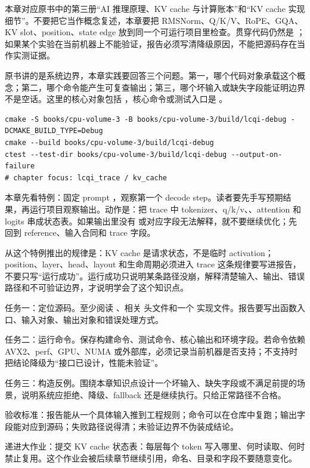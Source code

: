
本章对应原书中的第三册“AI 推理原理、KV cache 与计算账本”和“KV cache 实现细节”。不要把它当作概念复述，本章要把 RMSNorm、Q/K/V、RoPE、GQA、KV slot、position、state edge 放到同一个可运行项目里检查。贯穿代码仍然是 ；如果某个实验在当前机器上不能验证，报告必须写清降级原因，不能把源码存在当作实测证据。


原书讲的是系统边界，本章实践要回答三个问题。第一，哪个代码对象承载这个概念；第二，哪个命令能产生可复查输出；第三，哪个坏输入或缺失字段能证明边界不是空话。这里的核心对象包括 ，核心命令或测试入口是 。

\begin{lstlisting}[numbers=none,caption={第 5 章实践：Transformer 切片与 KV Cache 状态 的最小命令入口}]
cmake -S books/cpu-volume-3 -B books/cpu-volume-3/build/lcqi-debug -DCMAKE_BUILD_TYPE=Debug
cmake --build books/cpu-volume-3/build/lcqi-debug
ctest --test-dir books/cpu-volume-3/build/lcqi-debug --output-on-failure
# chapter focus: lcqi_trace / kv_cache
\end{lstlisting}


本章先看特例：固定 prompt ，观察第一个 decode step。读者要先手写预期结果，再运行项目观察输出。动作是：把 trace 中 tokenizer、q/k/v、、attention 和 logits 串成状态表。如果输出里没有  或对应字段无法解释，就不要继续优化；先回到 reference、输入合同和 trace 字段。

从这个特例推出的规律是：KV cache 是请求状态，不是临时 activation；position、layer、head、layout 和生命周期必须进入 trace 这条规律要写进报告，不要只写“运行成功”。运行成功只说明某条路径没崩，解释清楚输入、输出、错误路径和不可验证边界，才说明学会了这个知识点。


任务一：定位源码。至少阅读 、相关  头文件和一个  实现文件。报告要写出函数入口、输入对象、输出对象和错误处理方式。

任务二：运行命令。保存构建命令、测试命令、核心输出和环境字段。若命令依赖 AVX2、perf、GPU、NUMA 或外部库，必须记录当前机器是否支持；不支持时把结论降级为“接口已设计，性能未验证”。

任务三：构造反例。围绕本章知识点设计一个坏输入、缺失字段或不满足前提的场景，说明系统应拒绝、降级、fallback 还是继续执行。只给正常路径不合格。


验收标准：报告能从一个具体输入推到工程规则；命令可以在仓库中复跑；输出字段能对应到源码；失败路径说得清；未验证边界不伪装成结论。

递进大作业：提交 KV cache 状态表：每层每个 token 写入哪里、何时读取、何时禁止复用。这个作业会被后续章节继续引用，命名、目录和字段不要随意变化。
